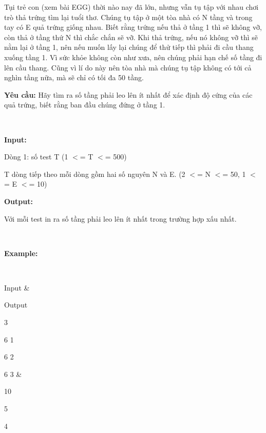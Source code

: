 



Tụi trẻ con (xem bài EGG) thời nào nay đã lớn, nhưng vẫn tụ tập với nhau chơi trò thả trứng tìm lại tuổi thơ. Chúng tụ tập ở một tòa nhà có N tầng và trong tay có E quả trứng giống nhau. Biết rằng trứng nếu thả ở tầng 1 thì sẽ không vỡ, còn thả ở tầng thứ N thì chắc chắn sẽ vỡ. Khi thả trứng, nếu nó không vỡ thì sẽ nằm lại ở tầng 1, nên nếu muốn lấy lại chúng để thử tiếp thì phải đi cầu thang xuống tầng 1. Vì sức khỏe không còn như xưa, nên chúng phải hạn chế số tầng đi lên cầu thang. Cũng vì lí do này nên tòa nhà mà chúng tụ tập không có tới cả nghìn tầng nữa, mà sẽ chỉ có tối đa 50 tầng.

\textbf{Yêu cầu:} Hãy tìm ra số tầng phải leo lên ít nhất để xác định độ cứng của các quả trứng, biết rằng ban đầu chúng đứng ở tầng 1.

 

\textbf{Input:}

Dòng 1: số test T (1 $<$= T $<$= 500)

T dòng tiếp theo mỗi dòng gồm hai số nguyên N và E. (2 $<$= N $<$= 50, 1 $<$= E $<$= 10)


\textbf{Output:}

Với mỗi test in ra số tầng phải leo lên ít nhất trong trường hợp xấu nhất.

 

\textbf{Example:}

 
\begin{tabular}\hline 


Input & 

Output  
\hline


3

6 1

6 2

6 3 & 

10

5

4  
\hline

\end{tabular}
